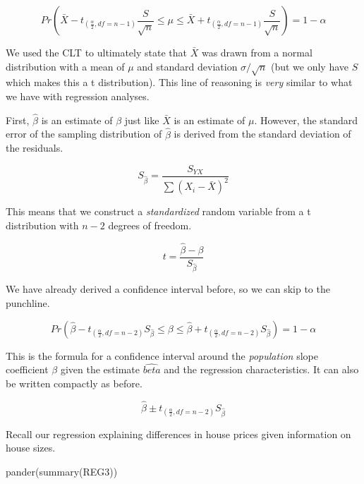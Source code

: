 \documentclass[
]{book}
\newenvironment{Shaded}{\begin{snugshade}}{\end{snugshade}}
\newcommand{\FunctionTok}[1]{\textcolor[rgb]{0.00,0.00,0.00}{#1}}
\newcommand{\NormalTok}[1]{#1}
\begin{document}
\[Pr\left(\bar{X}-t_{(\frac{\alpha}{2},df=n-1)}\frac{S}{\sqrt{n}} \leq \mu \leq \bar{X}+t_{(\frac{\alpha}{2},df=n-1)}\frac{S}{\sqrt{n}}\right)=1-\alpha\]

We used the CLT to ultimately state that \(\bar{X}\) was drawn from a normal distribution with a mean of \(\mu\) and standard deviation \(\sigma/\sqrt{n}\) (but we only have \(S\) which makes this a t distribution). This line of reasoning is \emph{very} similar to what we have with regression analyses.

First, \(\hat{\beta}\) is an estimate of \(\beta\) just like \(\bar{X}\) is an estimate of \(\mu\). However, the standard error of the sampling distribution of \(\hat{\beta}\) is derived from the standard deviation of the residuals.

\[S_{\hat{\beta}}=\frac{S_{YX}}{\sum{(X_i-\bar{X})^2}}\]

This means that we construct a \emph{standardized} random variable from a t distribution with \(n-2\) degrees of freedom.

\[t=\frac{\hat{\beta}-\beta}{S_{\hat{\beta}}}\]

We have already derived a confidence interval before, so we can skip to the punchline.

\[Pr\left(\hat{\beta}-t_{(\frac{\alpha}{2},df=n-2)}S_{\hat{\beta}} \leq \beta \leq \hat{\beta}+t_{(\frac{\alpha}{2},df=n-2)}S_{\hat{\beta}}\right)=1-\alpha\]

This is the formula for a confidence interval around the \emph{population} slope coefficient \(\beta\) given the estimate \(\hat{beta}\) and the regression characteristics. It can also be written compactly as before.

\[\hat{\beta} \pm t_{(\frac{\alpha}{2},df=n-2)} S_{\hat{\beta}}\]

Recall our regression explaining differences in house prices given information on house sizes.

\begin{Shaded}
\begin{Highlighting}[]
\FunctionTok{pander}\NormalTok{(}\FunctionTok{summary}\NormalTok{(REG3))}
\end{Highlighting}
\end{Shaded}
\end{document}
